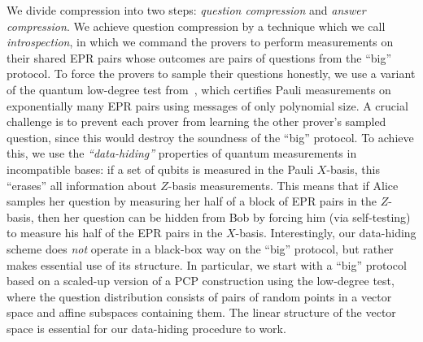 We
divide compression into two steps: \emph{question compression} and
\emph{answer compression}. We
achieve question compression by a technique which we call
\emph{introspection}, in which we command the provers to perform
measurements on their shared EPR pairs whose outcomes are pairs of questions
from the ``big'' protocol. To force the provers to sample their
questions honestly, we use a variant of the quantum low-degree test
from~\cite{NV18a}, which certifies Pauli measurements on exponentially
many EPR pairs using messages of only polynomial size. A crucial
challenge is to prevent each prover from learning the other prover's
sampled question, since this would destroy the soundness of the
``big'' protocol. To achieve this, we use the \emph{``data-hiding''} properties of quantum measurements
in incompatible bases: if a set of qubits is measured in the Pauli $X$-basis,
this ``erases'' all information about $Z$-basis
measurements. This means that if Alice samples her question by
measuring her half of a block of EPR pairs in the $Z$-basis, then her question can
be hidden from Bob by forcing him (via self-testing) to measure his
half of the EPR pairs in the $X$-basis. Interestingly, our data-hiding scheme
does \emph{not} operate in a black-box way on the ``big'' protocol, but
rather makes essential use of its structure. In particular, we start
with a ``big'' protocol based on a scaled-up version of a PCP
construction using the low-degree test, where the question
distribution consists of pairs of random points in a vector space and
affine subspaces containing them. The linear structure of the vector
space is essential for our data-hiding procedure to work.

